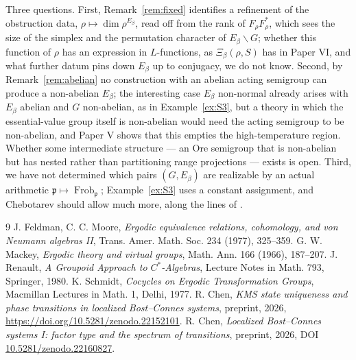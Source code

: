 \documentclass[11pt]{amsart}
\numberwithin{equation}{section}
\theoremstyle{definition}
\theoremstyle{remark}
\newcommand{\pp}{\mathfrak{p}}
\newcommand{\Frob}{\operatorname{Frob}}
\begin{document}
Three questions. First, Remark~\ref{rem:fixed} identifies a refinement of the
obstruction data, $\rho\mapsto\dim\rho^{E_\beta}$, read off from the rank of
$F_\rho F_\rho^*$, which sees the size of the simplex and the permutation character of
$E_\beta\backslash G$; whether this function of $\rho$ has an expression in $L$-functions,
as $\Xi_\beta(\rho,S)$ has in Paper VI, and what further datum pins down $E_\beta$ up to
conjugacy, we do not know.
Second, by
Remark~\ref{rem:abelian} no construction with an abelian acting semigroup can produce a
non-abelian $E_\beta$; the interesting case $E_\beta$ non-normal already arises with
$E_\beta$ abelian and $G$ non-abelian, as in Example~\ref{ex:S3}, but a theory in which the
essential-value group itself is non-abelian would need the acting semigroup to be
non-abelian, and Paper V shows that this empties the high-temperature region. Whether some intermediate structure --- an Ore semigroup that is non-abelian but has
nested rather than partitioning range projections --- exists is open. Third, we have not
determined which pairs $(G,E_\beta)$ are realizable by an actual arithmetic
$\pp\mapsto\Frob_\pp$; Example~\ref{ex:S3} uses a constant assignment, and Chebotarev should
allow much more, along the lines of \cite[Thm.~5.1]{SeriesI}.

\begin{thebibliography}{9}
 J. Feldman, C. C. Moore, \emph{Ergodic equivalence relations, cohomology, and von Neumann algebras II}, Trans. Amer. Math. Soc. 234 (1977), 325--359.
 G. W. Mackey, \emph{Ergodic theory and virtual groups}, Math. Ann. 166 (1966), 187--207.
 J. Renault, \emph{A Groupoid Approach to $C^*$-Algebras}, Lecture Notes in Math. 793, Springer, 1980.
 K. Schmidt, \emph{Cocycles on Ergodic Transformation Groups}, Macmillan Lectures in Math. 1, Delhi, 1977.
 R. Chen, \emph{KMS state uniqueness and phase transitions in localized Bost--Connes systems}, preprint, 2026, \newline\url{https://doi.org/10.5281/zenodo.22152101}.
 R. Chen, \emph{Localized Bost--Connes systems I: factor type and the spectrum of transitions}, preprint, 2026, DOI \href{https://doi.org/10.5281/zenodo.22160827}{10.5281/zenodo.22160827}.
\end{thebibliography}
\end{document}
